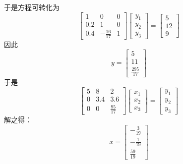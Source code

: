 \documentclass[twocolumn]{article}
\newenvironment{SChinese}{%
	\CJKfamily{gbsn}%
	\CJKtilde
	\CJKnospace}{}
\begin{document}
\begin{CJK}{UTF8}{}
\begin{SChinese}
			于是方程可转化为\begin{displaymath}
				\left [\begin{matrix}
				1 & 0 & 0 \\
				0.2 & 1 & 0 \\
				0.4 & -\frac{16}{17} & 1  
				\end{matrix}\right]\left [\begin{matrix}
				y_1\\ y_2 \\ y_3  
				\end{matrix}\right] = \left [\begin{matrix}
				5\\ 12 \\ 9  
				\end{matrix}\right]
			\end{displaymath}
			因此\begin{displaymath}
			y=\left [\begin{matrix}
			5 \\ 11 \\ \frac{295}{17}
			\end{matrix}\right]
			\end{displaymath}
			于是\begin{displaymath}
			\left [\begin{matrix}
			5 & 8 & 2 \\
			0 & 3.4 & 3.6 \\
			0 & 0 & \frac{95}{17}  
			\end{matrix}\right]\left [\begin{matrix}
			x_1\\ x_2 \\ x_3  
			\end{matrix}\right] = \left [\begin{matrix}
			y_1\\ y_2 \\ y_3  
			\end{matrix}\right]
			\end{displaymath}
			解之得：\begin{displaymath}
			x=\left [\begin{matrix}
			-\frac{3}{19} \\ -\frac{1}{19} \\ \frac{59}{19} 
			\end{matrix}\right]
			\end{displaymath}

\end{SChinese}
\end{CJK}
\end{document}
